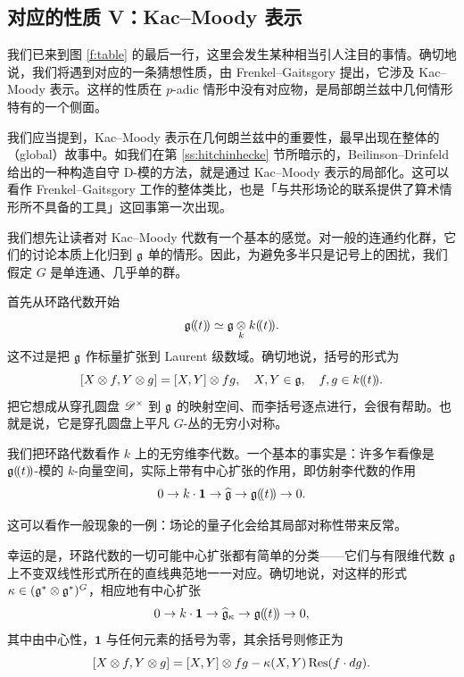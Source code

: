 \subsection{对应的性质 V：Kac--Moody 表示}

\ssszh 我们已来到图 \ref{f:table} 的最后一行，这里会发生某种相当引人注目的事情。确切地说，我们将遇到对应的一条猜想性质，由 Frenkel--Gaitsgory \cite{frenkgaitslocallangds} 提出，它涉及 Kac--Moody 表示。这样的性质在 $p$-adic 情形中没有对应物，是局部朗兰兹中几何情形特有的一个侧面。

\begin{re} 我们应当提到，Kac--Moody 表示在几何朗兰兹中的重要性，最早出现在整体的（global）故事中。如我们在第 \ref{ss:hitchinhecke} 节所暗示的，Beilinson--Drinfeld 给出的一种构造自守 D-模的方法，就是通过 Kac--Moody 表示的局部化。这可以看作 Frenkel--Gaitsgory 工作的整体类比，也是「与共形场论的联系提供了算术情形所不具备的工具」这回事第一次出现。\end{re}

\ssszh 我们想先让读者对 Kac--Moody 代数有一个基本的感觉。对一般的连通约化群，它们的讨论本质上化归到 $\mathfrak{g}$ 单的情形。因此，为避免多半只是记号上的困扰，我们假定 $G$ 是单连通、几乎单的群。

首先从环路代数开始
\[
\mathfrak{g}(\!(t)\!) \simeq \mathfrak{g} \underset  k \otimes k(\!(t)\!).
\]
这不过是把 $\mathfrak{g}$ 作标量扩张到 Laurent 级数域。确切地说，括号的形式为
\[
[ X \otimes f, Y \otimes g] = [X,Y] \otimes fg, \quad X,Y \in \mathfrak{g}, \quad
f, g \in k(\!(t)\!).
\]
把它想成从穿孔圆盘 $\mathscr{D}^\times$ 到 $\mathfrak{g}$ 的映射空间、而李括号逐点进行，会很有帮助。也就是说，它是穿孔圆盘上平凡 $G$-丛的无穷小对称。

我们把环路代数看作 $k$ 上的无穷维李代数。一个基本的事实是：许多乍看像是 $\mathfrak{g}(\!(t)\!)$-模的 $k$-向量空间，实际上带有中心扩张的作用，即仿射李代数的作用
\[
0 \rightarrow k \cdot \mathbf{1} \rightarrow \widehat{\mathfrak{g}} \rightarrow
\mathfrak{g}(\!(t)\!) \rightarrow 0.
\]

\begin{re} 这可以看作一般现象的一例：场论的量子化会给其局部对称性带来反常。\end{re}

幸运的是，环路代数的一切可能中心扩张都有简单的分类——它们与有限维代数 $\mathfrak{g}$ 上不变双线性形式所在的直线典范地一一对应。确切地说，对这样的形式 $\kappa \in (\mathfrak{g}^* \otimes \mathfrak{g}^*)^G$，相应地有中心扩张
\[
0 \rightarrow k \cdot \mathbf{1} \rightarrow \widehat{\mathfrak{g}}_\kappa \rightarrow \mathfrak{g}(\!(t)\!)
\rightarrow 0,
\]
其中由中心性，$\mathbf{1}$ 与任何元素的括号为零，其余括号则修正为
\[
[X \otimes f, Y \otimes g] = [X,Y] \otimes fg - \kappa(X,Y) \operatorname{Res} (f
\cdot dg).
\]

